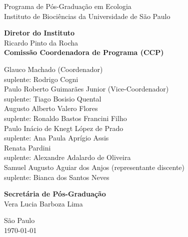 {\LARGE Programa de Pós-Graduação em Ecologia \\[1ex]
  Instituto de Biociências da Universidade de São Paulo\\[1ex]
  }
\par
\vspace{0.01\paperheight}

{\Large 
  \textbf{Diretor do Instituto} \\[0.5em]
  Ricardo Pinto da Rocha\\
  \vspace{2em}
  \textbf{Comissão Coordenadora de Programa (CCP)} \\[0.5em]
  \begin{spacing}{1.2}
    Glauco Machado (Coordenador)\\
    suplente: Rodrigo Cogni \\ [0.75 em]
    Paulo Roberto Guimarães Junior (Vice-Coordenador)\\
    suplente: Tiago Bosisio Quental \\ [0.75 em]
    Augusto Alberto Valero Flores\\
    suplente: Ronaldo Bastos Francini Filho \\ [0.75 em]
    Paulo Inácio de Knegt López de Prado\\
    suplente: Ana Paula Aprígio Assis\\ [0.75 em]
    Renata Pardini\\
    suplente:  Alexandre Adalardo de Oliveira  \\ [0.75 em]
    Samuel Augusto Aguiar dos Anjos (representante discente)\\ [0.75 em]
    suplente: Bianca dos Santos Neves 
  \end{spacing}
  \vspace{1.25em}
  \textbf{Secretária de Pós-Graduação}\\[0.5em]
  Vera Lucia Barboza Lima\\
}

\vfill

{\Large São Paulo\\
\today}

